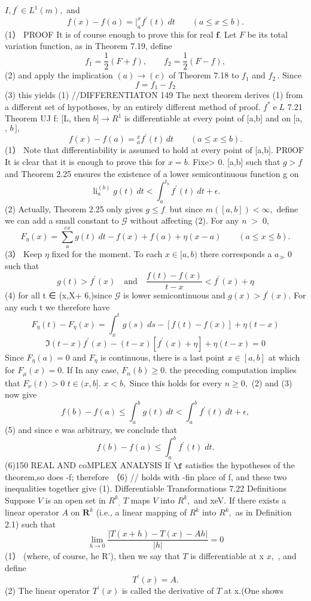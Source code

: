 $I,f^{\prime}\in L^{1}(m),$ and $$ f(x)-f(a)=\left.\right|_{a}^{x}f^{\prime}(t)\;d t\qquad(a\leq x\leq b). $$ (1） PROOF It is of course enough to prove this for real ${\boldsymbol{f}}.$ Let ${\mathbf{}}F$ be its total variation function, as in Theorem 7.19, define $$ f_{1}={\frac{1}{2}}(F+f),\qquad f_{2}={\frac{1}{2}}(F-f), $$ (2) and apply the implication $(a)\to(c)$ of Theorem 7.18 to $f_{1}$ and $f_{2}\,.$ Since $$ f=f_{1}-f_{2} $$ (3) this yields (1) //DIFFERENTIATON 149 The next theorem derives (1) from a different set of hypotheses, by an entirely different method of proof. $f^{*}\operatorname{e}L$ 7.21 Theorem UJ f: [L, then $b]\to R^{1}$ is differentiable at every point of [a,b] and on [a, $,\,b\,],$ $$ f(x)-f(a)=\left.\right._{a}^{x}f^{\prime}(t)\,d t\qquad(a\leq x\leq b). $$ (1） Note that differentiability is assumed to hold at every point of [a,b]. PR0OF ${\mathrm{It}}$ is clear that it is enough to prove this for $x=b.$ Fixe> 0. [a,b] such that $\scriptstyle g>f$ and Theorem 2.25 ensures the existence of a lower semicontinuous function g on $$ \operatorname{li}_{a}^{(b)}g(t)\ d t<\int_{a}^{t_{b}}f^{\prime}(t)\ d t+\epsilon. $$ (2) Actually, Theorem 2.25 only gives $\scriptstyle g\leq f_{\cdot}$ but since $m([a,b])<\infty,$ define we can add a small constant to $\scriptstyle{\mathcal{G}}$ without affecting (2). For any $\scriptstyle n\;>\;0,$ $$ F_{\eta}(x)=\sum_{a}^{e x}g(t)\ d t-f(x)+f(a)+\eta(x-a)\qquad(a\leq x\leq b). $$ (3） Keep $\textstyle\eta$ fixed for the moment. To each $x\in[a,b)$ there corresponds a $\scriptstyle a_{\gg}\;0$ such that $$ g(t)>f^{\prime}(x)\quad{\mathrm{and}}\quad{\frac{f(t)-f(x)}{t-x}}<f^{\prime}(x)+\eta $$ (4) for all t ∈ (x,X+ 6,)since $\scriptstyle{\mathcal{G}}$ is lower semicontinuous and $g(x)>f^{\prime}(x).$ For any such t we therefore have $$ F_{\eta}(t)-F_{\eta}(x)=\left.\int_{x}^{t}g(s)\;d s-[f(t)-f(x)]+\eta(t-x)\right.\nonumber $$ $$ \Im\left(t-x\right)f^{\prime}(x)-(t-x)[f^{\prime}(x)+\eta]+\eta(t-x)=0 $$ Since $F_{\eta}(a)=0$ and $F_{\eta}$ is continuous, there is a last point $x\in[a,b]$ at which for $F_{\mu}(x)=0.$ If In any case, $F_{n}(b)\geq0.$ the preceding computation implies that $F_{\nu}(t)>0$ $t\in(x,b].$ $x<b,$ Since this holds for every $\scriptstyle n\geq0,$ (2) and (3) now give $$ f(b)-f(a)\leq\int_{a}^{b}g(t)\ d t<\int_{a}^{b}\!f^{\prime}(t)\ d t+\epsilon, $$ (5) and since e was arbitrary, we conclude that $$ f(b)-f(a)\leq\int_{a}^{b}f^{\prime}(t)\;d t. $$ (6)150 REAL AND coMPLEX ANALYSIS If $\boldsymbol{\f}$ satisfies the hypotheses of the theorem,so does -f; therefore （6) // holds with -fin place of f, and these two inequalities together give (1). Differentiable Transformations 7.22 Definitions Suppose $V\!$ is an open set in $R^{k}{}_{,}$ ${\mathbf{}}T$ maps ${\mathbf{}}V$ into $R^{k},$ and xeV. If there exists a linear operator $\scriptstyle A$ on ${\boldsymbol{R}}^{k}$ (i.e., a linear mapping of $R^{k}$ into $R^{k},$ as in Definition 2.1) such that $$ \operatorname*{lim}_{h\to0}{\frac{|T(x+h)-T(x)-A h|}{|h|}}=0 $$ (1） (where, of course, he R'), then we say that ${\mathbf{}}T$ is differentiable at x $x,$ , and define $$ T^{\prime}(x)=A. $$ (2) The linear operator $T^{\prime}(x)$ is called the derivative of ${\mathbf{}}T$ at x.(One shows 